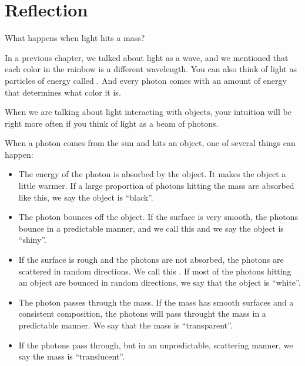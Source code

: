 \chapter{Reflection}

What happens when light hits a mass?

In a previous chapter, we talked about light as a wave, and we
mentioned that each color in the rainbow is a different
wavelength. You can also think of light as particles of energy called
. And every photon comes with an amount of energy
that determines what color it is.

When we are talking about light interacting with objects, your
intuition will be right more often if you think of light as a beam of
photons.

When a photon comes from the sun and hits an object, one of several
things can happen:

\begin{itemize}
  
  \item The energy of the photon is absorbed by the object. It makes the
    object a little warmer. If a large proportion of photons hitting the
    mass are absorbed like this, we say the object is ``black''.

 \item The photon bounces off the object.  If the surface is very
   smooth, the photons bounce in a predictable manner, and we call
   this  and we say the object is ``shiny''.

 \item If the surface is rough and the photons are not absorbed, the
   photons are scattered in random directions.  We call this
   .  If most of the photons hitting an object are
   bounced in random directions, we say that the object is ``white''.

 \item The photon passes through the mass.  If the mass has smooth
   surfaces and a consistent composition, the photons will pass throught the
   mass in a predictable manner.  We say that the mass is ``transparent''.

 \item If the photons pass through, but in an unpredictable,
   scattering manner, we say the mass is ``translucent''. 

\end{itemize}

